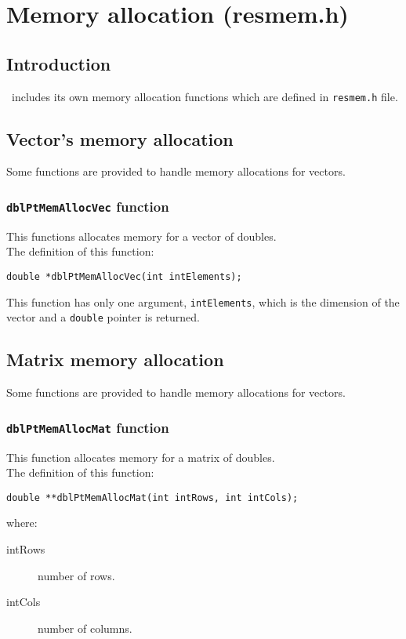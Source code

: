 %
%

\chapter{Memory allocation (resmem.h)}

\section{Introduction}

\BI\ includes its own memory allocation functions which are defined in \texttt{resmem.h} file.

\section{Vector's memory allocation}

Some functions are provided to handle memory allocations for vectors.

\subsection{\texttt{dblPtMemAllocVec} function} \label{sec:dblPtMemAllocVec}

This functions allocates memory for a vector of doubles.\\

The definition of this function:
%
\begin{verbatim}
double *dblPtMemAllocVec(int intElements);  
\end{verbatim}
%
This function has only one argument, \texttt{intElements}, which is the dimension of the vector and a \texttt{double} pointer is returned.

\section{Matrix memory allocation}

Some functions are provided to handle memory allocations for vectors.

\subsection{\texttt{dblPtMemAllocMat} function} \label{sec:dblPtMemAllocMat}

This function allocates memory for a matrix of doubles.\\

The definition of this function:
%
\begin{verbatim}
double **dblPtMemAllocMat(int intRows, int intCols);
\end{verbatim}
%
where:
%
\begin{description}
\item[intRows] number of rows.
\item[intCols] number of columns.
\end{description}


